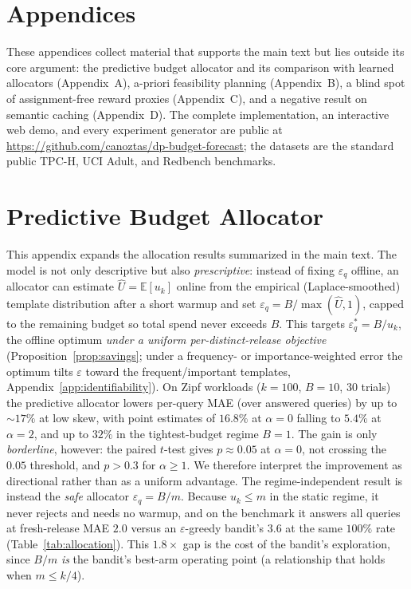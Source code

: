 \documentclass[sigconf,nonacm]{acmart}
\newcommand{\eps}{\varepsilon}
\newcommand{\E}{\mathbb{E}}
\begin{document}
\section*{Appendices}
\noindent These appendices collect material that supports the main text but lies outside its core argument: the predictive budget allocator and its comparison with learned allocators (Appendix~A), a-priori feasibility planning (Appendix~B), a blind spot of assignment-free reward proxies (Appendix~C), and a negative result on semantic caching (Appendix~D). The complete implementation, an interactive web demo, and every experiment generator are public at \url{https://github.com/canoztas/dp-budget-forecast}; the datasets are the standard public TPC-H, UCI Adult, and Redbench benchmarks.

\section{Predictive Budget Allocator}
\label{app:allocator}

This appendix expands the allocation results summarized in the main text. The model is not only descriptive but also \emph{prescriptive}: instead of fixing $\eps_q$ offline, an allocator can estimate $\hat U=\E[u_{k}]$ online from the empirical (Laplace-smoothed) template distribution after a short warmup and set $\eps_q=B/\max(\hat U,1)$, capped to the remaining budget so total spend never exceeds $B$. This targets $\eps_q^*=B/u_k$, the offline optimum \emph{under a uniform per-distinct-release objective} (Proposition~\ref{prop:savings}; under a frequency- or importance-weighted error the optimum tilts $\eps$ toward the frequent/important templates, Appendix~\ref{app:identifiability}). On Zipf workloads ($k{=}100$, $B{=}10$, 30 trials) the predictive allocator lowers per-query MAE (over answered queries) by up to $\sim$$17\%$ at low skew, with point estimates of $16.8\%$ at $\alpha{=}0$ falling to $5.4\%$ at $\alpha{=}2$, and up to $32\%$ in the tightest-budget regime $B{=}1$. The gain is only \emph{borderline}, however: the paired $t$-test gives $p\approx0.05$ at $\alpha{=}0$, not crossing the $0.05$ threshold, and $p>0.3$ for $\alpha\ge1$. We therefore interpret the improvement as directional rather than as a uniform advantage. The regime-independent result is instead the \emph{safe} allocator $\eps_q{=}B/m$. Because $u_k\le m$ in the static regime, it never rejects and needs no warmup, and on the benchmark it answers all queries at fresh-release MAE $2.0$ versus an $\eps$-greedy bandit's $3.6$ at the same $100\%$ rate (Table~\ref{tab:allocation}). This $1.8\times$ gap is the cost of the bandit's exploration, since $B/m$ \emph{is} the bandit's best-arm operating point (a relationship that holds when $m\le k/4$).
\end{document}
